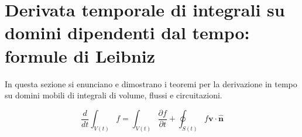 \newpage
\section{Derivata temporale di integrali su domini dipendenti dal tempo: formule di Leibniz}\label{sec:richiami:leibniz}
In questa sezione si enunciano e dimostrano i teoremi per la derivazione in tempo su domini mobili di integrali di volume, flussi e circuitazioni.
 
\begin{theorem}\label{thm:reynolds}
%
\begin{equation}
  \frac{d}{dt}\int_{V(t)} f = 
  \int_{V(t)} \frac{\partial f}{\partial t} + 
  \oint_{S(t)} f \bm{v} \cdot \bm{\hat{n}}
\end{equation}
\end{theorem}

